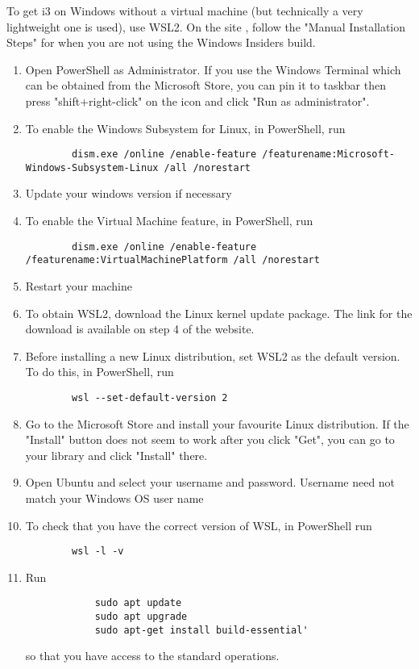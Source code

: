 To get i3 on Windows without a virtual machine (but technically a very
lightweight one is used), use WSL2. On the site \cite{microsoft2020wsl} , follow
the "Manual Installation Steps" for when you are not using the Windows Insiders
build.
\begin{enumerate}
    \item Open PowerShell as Administrator. If you use the Windows Terminal
        which can be obtained from the Microsoft Store, you can pin it to taskbar then
        press "shift+right-click" on the icon and click "Run as administrator".
    \item To enable the Windows Subsystem for Linux, in PowerShell, run
        \begin{lstlisting}
        dism.exe /online /enable-feature /featurename:Microsoft-Windows-Subsystem-Linux /all /norestart
        \end{lstlisting}
    \item Update your windows version if necessary
    \item To enable the Virtual Machine feature, in PowerShell, run
        \begin{lstlisting}
        dism.exe /online /enable-feature /featurename:VirtualMachinePlatform /all /norestart
        \end{lstlisting}
    \item Restart your machine
    \item To obtain WSL2, download the Linux kernel update package. The link for the download is
        available on step 4 of the website.
    \item Before installing a new Linux distribution, set WSL2 as the default version. To do this,
        in PowerShell, run
        \begin{lstlisting}
        wsl --set-default-version 2
        \end{lstlisting}
    \item Go to the Microsoft Store and install your favourite Linux distribution. If the "Install"
        button does not seem to work after you click "Get", you can go to your library and click
        "Install" there.
    \item Open Ubuntu and select your username and password. Username need not match your Windows
        OS user name
    \item To check that you have the correct version of WSL, in PowerShell run
        \begin{lstlisting}
        wsl -l -v
        \end{lstlisting}
    \item Run
        \begin{lstlisting}
            sudo apt update
            sudo apt upgrade
            sudo apt-get install build-essential'
        \end{lstlisting}
        so that you have access to the standard operations.
\end{enumerate}
